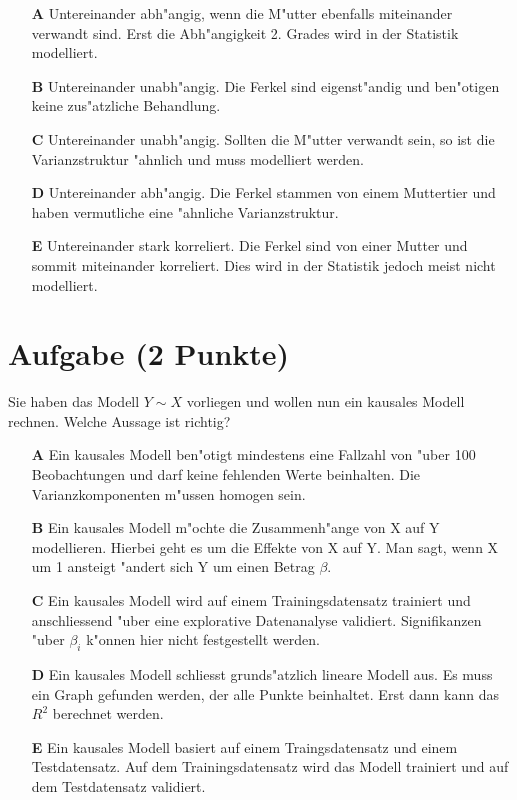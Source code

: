 \documentclass[a4paper, 10pt]{scrartcl}\usepackage[]{graphicx}\usepackage[]{xcolor}
\begin{document}
\begin{enumerate}
\item [\textbf{A} \msquare] Untereinander abh{"a}ngig, wenn die M{"u}tter ebenfalls miteinander verwandt sind. Erst die Abh{"a}ngigkeit 2. Grades wird in der Statistik modelliert.
\item [\textbf{B} \msquare] Untereinander unabh{"a}ngig. Die Ferkel sind eigenst{"a}ndig und ben{"o}tigen keine zus{"a}tzliche Behandlung.
\item [\textbf{C} \msquare] Untereinander unabh{"a}ngig. Sollten die M{"u}tter verwandt sein, so ist die Varianzstruktur {"a}hnlich und muss modelliert werden.
\item [\textbf{D} \msquare] Untereinander abh{"a}ngig. Die Ferkel stammen von einem Muttertier und haben vermutliche eine {"a}hnliche Varianzstruktur.
\item [\textbf{E} \msquare] Untereinander stark korreliert. Die Ferkel sind von einer Mutter und sommit miteinander korreliert. Dies wird in der Statistik jedoch meist nicht modelliert.
\end{enumerate}

\section{Aufgabe \hfill (2 Punkte)}




Sie haben das Modell $Y \sim X$ vorliegen und wollen nun ein
kausales Modell rechnen. Welche Aussage ist richtig?



\begin{enumerate}
\item [\textbf{A} \msquare] Ein kausales Modell ben{"o}tigt mindestens eine Fallzahl von {"u}ber 100 Beobachtungen und darf keine fehlenden Werte beinhalten. Die Varianzkomponenten m{"u}ssen homogen sein.
\item [\textbf{B} \msquare] Ein kausales Modell m{"o}chte die Zusammenh{"a}nge von X auf Y modellieren. Hierbei geht es um die Effekte von X auf Y. Man sagt, wenn X um 1 ansteigt {"a}ndert sich Y um einen Betrag $\beta$.
\item [\textbf{C} \msquare] Ein kausales Modell wird auf einem Trainingsdatensatz trainiert und anschliessend {"u}ber eine explorative Datenanalyse validiert. Signifikanzen {"u}ber $\beta_i$ k{"o}nnen hier nicht festgestellt werden.
\item [\textbf{D} \msquare] Ein kausales Modell schliesst grunds{"a}tzlich lineare Modell aus. Es muss ein Graph gefunden werden, der alle Punkte beinhaltet. Erst dann kann das $R^2$ berechnet werden.
\item [\textbf{E} \msquare] Ein kausales Modell basiert auf einem Traingsdatensatz und einem Testdatensatz. Auf dem Trainingsdatensatz wird das Modell trainiert und auf dem Testdatensatz validiert.
\end{enumerate}
\end{document}
